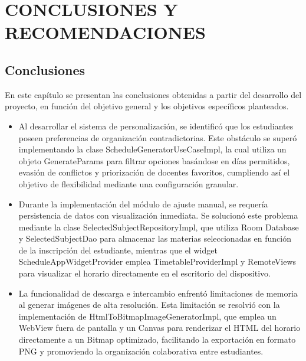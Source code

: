 \chapter{CONCLUSIONES Y RECOMENDACIONES}

\setlength{\emergencystretch}{2em}
\renewcommand{\arraystretch}{1.15}

\section{Conclusiones}

\noindent En este capítulo se presentan las conclusiones obtenidas a partir del desarrollo del proyecto, en función del objetivo general y los objetivos específicos planteados.

\begin{itemize}
\setlength\itemsep{0.45em}\setlength\parskip{0.45em}\setlength\parsep{0.45em}

\item Al desarrollar el sistema de personalización, se identificó que los estudiantes poseen preferencias de organización contradictorias. Este obstáculo se superó implementando la clase ScheduleGeneratorUseCaseImpl, la cual utiliza un objeto GenerateParams para filtrar opciones basándose en días permitidos, evasión de conflictos y priorización de docentes favoritos, cumpliendo así el objetivo de flexibilidad mediante una configuración granular.

\item Durante la implementación del módulo de ajuste manual, se requería persistencia de datos con visualización inmediata. Se solucionó este problema mediante la clase SelectedSubjectRepositoryImpl, que utiliza Room Database y SelectedSubjectDao para almacenar las materias seleccionadas en función de la inscripción del estudiante, mientras que el widget ScheduleAppWidgetProvider emplea TimetableProviderImpl y RemoteViews para visualizar el horario directamente en el escritorio del dispositivo.

\item La funcionalidad de descarga e intercambio enfrentó limitaciones de memoria al generar imágenes de alta resolución. Esta limitación se resolvió con la implementación de HtmlToBitmapImageGeneratorImpl, que emplea un WebView fuera de pantalla y un Canvas para renderizar el HTML del horario directamente a un Bitmap optimizado, facilitando la exportación en formato PNG y promoviendo la organización colaborativa entre estudiantes.


\end{itemize}
